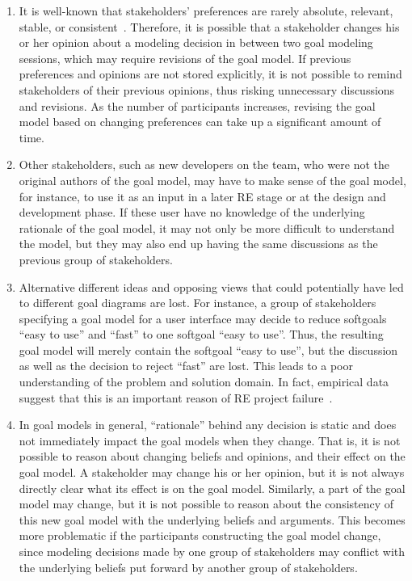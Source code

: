 
\begin{enumerate}
\item
It is well-known that stakeholders' preferences are rarely absolute, relevant, stable, or consistent~\cite{march1978bounded}. Therefore, it is possible that a stakeholder changes his or her opinion about a modeling decision in between two goal modeling sessions, which may require revisions of the goal model. If previous preferences and opinions are not stored explicitly, it is not possible to remind stakeholders of their previous opinions, thus risking unnecessary discussions and revisions. As the number of participants increases, revising the goal model based on changing preferences can take up a significant amount of time. 
\item
Other stakeholders, such as new developers on the team, who were not the original authors of the goal model, may have to make sense of the goal model, for instance, to use it as an input in a later RE stage or at the design and development phase. If these user have no knowledge of the underlying rationale of the goal model, it may not only be more difficult to understand the model, but they may also end up having the same discussions as the previous group of stakeholders. %
\item
Alternative different ideas and opposing views that could potentially have led to different goal diagrams are lost. For instance, a group of stakeholders specifying a goal model for a user interface may decide to reduce softgoals ``easy to use'' and ``fast'' to one softgoal ``easy to use''. Thus, the resulting goal model will merely contain the softgoal ``easy to use'', but the discussion as well as the decision to reject ``fast'' are lost. This leads to a poor understanding of the problem and solution domain. In fact, empirical data suggest that this is an important reason of RE project failure~\cite{curtis1988field}. 
\item
In goal models in general, ``rationale'' behind any decision is static and does not immediately impact the goal models when they change. That is, it is not possible to reason about changing beliefs and opinions, and their effect on the goal model. A stakeholder may change his or her opinion, but it is not always directly clear what its effect is on the goal model. Similarly, a part of the goal model may change, but it is not possible to reason about the consistency of this new goal model with the underlying beliefs and arguments. This becomes more problematic if the participants constructing the goal model change, since modeling decisions made by one group of stakeholders may conflict with the underlying beliefs put forward by another group of stakeholders.

\end{enumerate}
